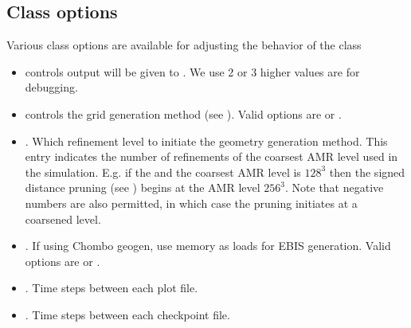 \documentclass[letterpaper,10pt,english]{sphinxmanual}
\begin{document}
\subsection{Class options}
\label{\detokenize{Source/Driver:class-options}}
\sphinxAtStartPar
Various class options are available for adjusting the behavior of the  class
\begin{itemize}
\item {} 
\sphinxAtStartPar
{} controls output will be given to . We use 2 or 3 \sphinxhyphen{} higher values are for debugging.

\item {} 
\sphinxAtStartPar
{} controls the grid generation method (see {\hyperref[\detokenize{Source/SpatialDiscretization:chap-geometrygeneration}]{}}).
Valid options are  or .

\item {} 
\sphinxAtStartPar
{}.
Which refinement level to initiate the  geometry generation method.
This entry indicates the number of refinements of the coarsest AMR level used in the simulation.
E.g. if the  and the coarsest AMR level is \(128^3\) then the signed distance pruning (see {\hyperref[\detokenize{Source/SpatialDiscretization:chap-geometrygeneration}]{}}) begins at the AMR level \(256^3\).
Note that negative numbers are also permitted, in which case the pruning initiates at a coarsened level.

\item {} 
\sphinxAtStartPar
{}. If using Chombo geo\sphinxhyphen{}gen, use memory as loads for EBIS generation. Valid options are  or .

\item {} 
\sphinxAtStartPar
{}. Time steps between each plot file.

\item {} 
\sphinxAtStartPar
{}. Time steps between each checkpoint file.


\end{itemize}
\end{document}
